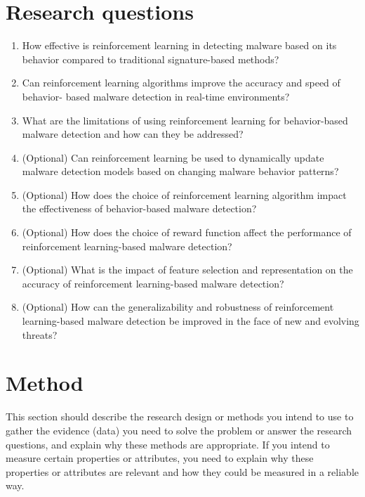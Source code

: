 \documentclass[12pt,a4paper,twoside]{article}
\begin{document}
\section{Research questions}
\label{sec:rq}
    \begin{enumerate}
    
        \item How effective is reinforcement learning in detecting malware based on its behavior
        compared to traditional signature-based methods?
        \item Can reinforcement learning algorithms improve the accuracy and speed of behavior-
        based malware detection in real-time environments?
        \item What are the limitations of using reinforcement learning for behavior-based malware
        detection and how can they be addressed?
        \item (Optional) Can reinforcement learning be used to dynamically update malware detection models
        based on changing malware behavior patterns?
        \item (Optional) How does the choice of reinforcement learning algorithm impact the effectiveness of
        behavior-based malware detection?
        \item (Optional) How does the choice of reward function affect the performance of reinforcement learning-based malware detection?
        \item (Optional) What is the impact of feature selection and representation on the accuracy of reinforcement learning-based malware detection?
        \item (Optional) How can the generalizability and robustness of reinforcement learning-based
        malware detection be improved in the face of new and evolving threats?
    \end{enumerate}

\section{Method}
\label{sec:method}
This section should describe the research design or methods you intend to use to gather the evidence (data) you need to solve the problem or answer the research questions, and explain why these
methods are appropriate. If you intend to measure certain properties or attributes, you
need to explain why these properties or attributes are relevant and how they could be measured
in a reliable way.
\end{document}
